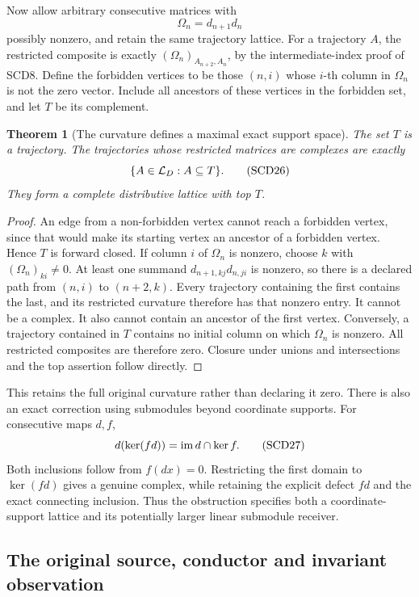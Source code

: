 \documentclass[11pt,a4paper]{article}
\newtheorem{theorem}{Theorem}[section]
\theoremstyle{definition}\newtheorem{definition}[theorem]{Definition}
\begin{document}
Now allow arbitrary consecutive matrices with
\[
 \Omega_n=d_{n+1}d_n
 \tag{SCD25}
\]
possibly nonzero, and retain the same trajectory lattice.
For a trajectory \(A\), the restricted composite is exactly
\((\Omega_n)_{A_{n+2},A_n}\), by the intermediate-index proof of
SCD8. Define the forbidden vertices to be those \((n,i)\)
whose \(i\)-th column in \(\Omega_n\) is not the zero vector.
Include all ancestors of these vertices in the forbidden set,
and let \(T\) be its complement.

\begin{theorem}[The curvature defines a maximal exact support space]
The set \(T\) is a trajectory. The trajectories whose restricted
matrices are complexes are exactly
\[
 \{A\in\mathcal L_D:A\subseteq T\}.
 \tag{SCD26}
\]
They form a complete distributive lattice with top \(T\).
\end{theorem}
\begin{proof}
An edge from a non-forbidden vertex cannot reach a forbidden
vertex, since that would make its starting vertex an ancestor
of a forbidden vertex. Hence \(T\) is forward closed.
If column \(i\) of \(\Omega_n\) is nonzero, choose \(k\)
with \((\Omega_n)_{ki}\ne0\). At least one summand
\(d_{n+1,kj}d_{n,ji}\) is nonzero, so there is a declared path
from \((n,i)\) to \((n+2,k)\). Every trajectory containing
the first contains the last, and its restricted curvature
therefore has that nonzero entry. It cannot be a complex.
It also cannot contain an ancestor of the first vertex.
Conversely, a trajectory contained in \(T\) contains no initial
column on which \(\Omega_n\) is nonzero. All restricted composites
are therefore zero. Closure under unions and intersections and
the top assertion follow directly.
\end{proof}

This retains the full original curvature rather than declaring it zero.
There is also an exact correction using submodules beyond coordinate
supports. For consecutive maps \(d,f\),
\[
 d(\ker(fd))=\operatorname{im} d\cap\ker f .
 \tag{SCD27}
\]
Both inclusions follow from \(f(dx)=0\). Restricting the first
domain to \(\ker(fd)\) gives a genuine complex, while retaining
the explicit defect \(fd\) and the exact connecting inclusion.
Thus the obstruction specifies both a coordinate-support lattice
and its potentially larger linear submodule receiver.

\subsection{The original source, conductor and invariant observation}
\end{document}
